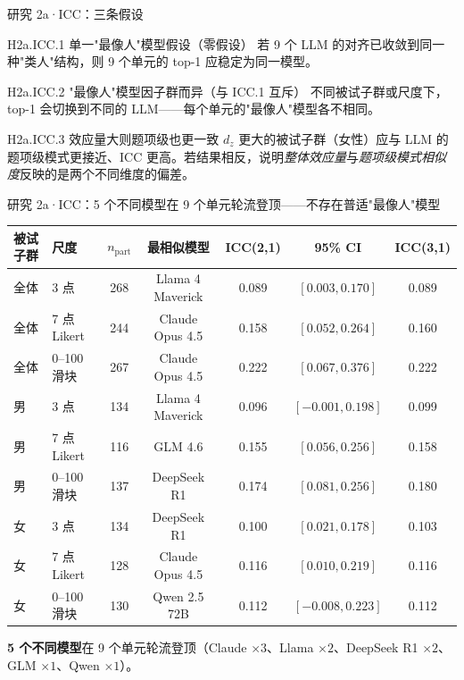 \documentclass[aspectratio=169,professionalfonts]{beamer}
\begin{document}
{
\begin{frame}{研究 2a·ICC：三条假设}
  \footnotesize
  \begin{block}{H2a.ICC.1 单一"最像人"模型假设（零假设）}
    \small 若 9 个 LLM 的对齐已收敛到同一种"类人"结构，则 9 个单元的 top-1 应稳定为同一模型。
  \end{block}
  \begin{block}{H2a.ICC.2 "最像人"模型因子群而异（与 ICC.1 互斥）}
    \small 不同被试子群或尺度下，top-1 会切换到不同的 LLM——每个单元的"最像人"模型各不相同。
  \end{block}
  \begin{block}{H2a.ICC.3 效应量大则题项级也更一致}
    \small $d_z$ 更大的被试子群（女性）应与 LLM 的题项级模式更接近、ICC 更高。若结果相反，说明\emph{整体效应量}与\emph{题项级模式相似度}反映的是两个不同维度的偏差。
  \end{block}
\end{frame}
}

\begin{frame}{研究 2a·ICC：5 个不同模型在 9 个单元轮流登顶——不存在普适"最像人"模型}
  \footnotesize
  \setlength{\tabcolsep}{4pt}
  \begin{table}
    \centering
    \begin{tabular}{llccccc}
      \toprule
      被试子群 & 尺度 & $n_\text{part}$ & 最相似模型 & ICC(2,1) & 95\% CI & ICC(3,1) \\
      \midrule
      全体 & 3 点        & 268 & Llama 4 Maverick & 0.089 & $[0.003, 0.170]$  & 0.089 \\
      全体 & 7 点 Likert & 244 & Claude Opus 4.5  & 0.158 & $[0.052, 0.264]$  & 0.160 \\
      全体 & 0--100 滑块 & 267 & Claude Opus 4.5  & 0.222 & $[0.067, 0.376]$  & 0.222 \\
      男   & 3 点        & 134 & Llama 4 Maverick & 0.096 & $[-0.001, 0.198]$ & 0.099 \\
      男   & 7 点 Likert & 116 & GLM 4.6          & 0.155 & $[0.056, 0.256]$  & 0.158 \\
      男   & 0--100 滑块 & 137 & DeepSeek R1      & 0.174 & $[0.081, 0.256]$  & 0.180 \\
      女   & 3 点        & 134 & DeepSeek R1      & 0.100 & $[0.021, 0.178]$  & 0.103 \\
      女   & 7 点 Likert & 128 & Claude Opus 4.5  & 0.116 & $[0.010, 0.219]$  & 0.116 \\
      女   & 0--100 滑块 & 130 & Qwen 2.5 72B     & 0.112 & $[-0.008, 0.223]$ & 0.112 \\
      \bottomrule
    \end{tabular}
  \end{table}

  \vspace{0.2em}
  \small \textbf{5 个不同模型}在 9 个单元轮流登顶（Claude $\times 3$、Llama $\times 2$、DeepSeek R1 $\times 2$、GLM $\times 1$、Qwen $\times 1$）。
\end{frame}
\end{document}
